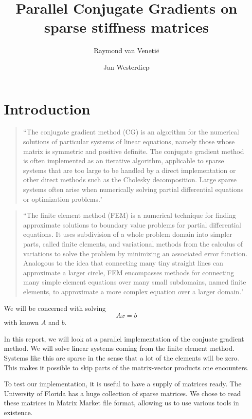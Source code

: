 \documentclass[11pt]{amsart}
\theoremstyle{definition}
\begin{document}
\title{Parallel Conjugate Gradients on sparse stiffness matrices}
\author{Raymond van Veneti\"e \and Jan Westerdiep}
\maketitle

\section{Introduction}
\begin{quote}
``The conjugate gradient method (CG) is an algorithm for the numerical solutions of particular systems of linear equations, namely those whose matrix is symmetric and positive definite. The conjugate gradient method is often implemented as an iterative algorithm, applicable to sparse systems that are too large to be handled by a direct implementation or other direct methods such as the Cholesky decomposition. Large sparse systems often arise when numerically solving partial differential equations or optimization problems." \cite{wiki:cg}
\end{quote}

\begin{quote}
``The finite element method (FEM) is a numerical technique for finding approximate solutions to boundary value problems for partial differential equations. It uses subdivision of a whole problem domain into simpler parts, called finite elements, and variational methods from the calculus of variations to solve the problem by minimizing an associated error function. Analogous to the idea that connecting many tiny straight lines can approximate a larger circle, FEM encompasses methods for connecting many simple element equations over many small subdomains, named finite elements, to approximate a more complex equation over a larger domain." \cite{wiki:fem}
\end{quote}

We will be concerned with solving
\[
  Ax = b
\]
with known $A$ and $b$.

In this report, we will look at a parallel implementation of the conjuate gradient method. We will solve linear systems coming from the finite element method. Systems like this are sparse in the sense that a lot of the elements will be zero. This makes it possible to skip parts of the matrix-vector products one encounters.

To test our implementation, it is useful to have a supply of matrices ready. The University of Florida has a huge collection of sparse matrices. \cite{uniflo} We chose to read these matrices in Matrix Market file format, allowing us to use various tools in existence. \cite{mondriaan,matmar}
\end{document}
